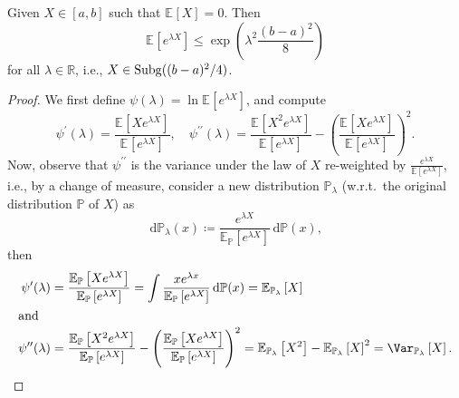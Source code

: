 \begin{lemma}\label{pf-lma:bounded-rv-is-sub-Gaussian}
	Given \(X\in [a, b]\) such that \(\mathbb{E}_{}\left[X \right] = 0\). Then
	\[
		\mathbb{E}_{}\left[e^{\lambda X} \right] \leq \exp (\lambda ^2 \frac{(b-a)^2}{8})
	\]
	for all \(\lambda \in \mathbb{R} \), i.e., \(X\in \operatorname{Subg}((b-a)^2 / 4) \).
\end{lemma}
\begin{proof}
	We first define \(\psi (\lambda ) = \ln \mathbb{E}_{}\left[e^{\lambda X} \right] \), and compute
	\[
		\psi ^{\prime} (\lambda ) = \frac{\mathbb{E}_{}\left[X e^{\lambda X} \right] }{\mathbb{E}_{}\left[e^{\lambda X} \right] },\quad
		\psi ^{\prime\prime} (\lambda ) = \frac{\mathbb{E}_{}\left[X^2 e^{\lambda X} \right] }{\mathbb{E}_{}\left[e^{\lambda X} \right] } - \left( \frac{\mathbb{E}_{}\left[X e^{\lambda X} \right] }{\mathbb{E}_{}\left[e^{\lambda X} \right] } \right) ^2.
	\]
	Now, observe that \(\psi ^{\prime\prime} \) is the variance under the law of \(X\) re-weighted by \(\frac{e^{\lambda X}}{\mathbb{E}_{}\left[e^{\lambda X} \right] }\), i.e., by a change of measure, consider a new distribution \(\mathbb{P} _\lambda \) (w.r.t.\ the original distribution \(\mathbb{P} \) of \(X\)) as
	\[
		\,\mathrm{d} \mathbb{P} _\lambda (x) \coloneqq \frac{e^{\lambda X}}{\mathbb{E}_{\mathbb{P} }\left[e^{\lambda X} \right] }\,\mathrm{d} \mathbb{P} (x),
	\]
	then
	\begin{align*}
		\psi ^{\prime} (\lambda )
		 & = \frac{\mathbb{E}_{\mathbb{P} }\left[X e^{\lambda X} \right] }{\mathbb{E}_{\mathbb{P} }\left[e^{\lambda X} \right] }
		= \int \frac{x e^{\lambda x}}{\mathbb{E}_{\mathbb{P} }\left[ e^{\lambda X}\right] } \,\mathrm{d} \mathbb{P} (x)
		= \mathbb{E}_{\mathbb{P} _\lambda }\left[ X \right]                                                                                                                                                                                                                   \\
		\shortintertext{and}
		\psi ^{\prime\prime} (\lambda )
		 & = \frac{\mathbb{E}_{\mathbb{P} }\left[ X^2 e^{\lambda X} \right] }{\mathbb{E}_{\mathbb{P} }\left[ e^{\lambda X} \right] } - \left( \frac{\mathbb{E}_{\mathbb{P} }\left[ X e^{\lambda X} \right] }{\mathbb{E}_{\mathbb{P} }\left[ e^{\lambda X}\right] } \right) ^2
		= \mathbb{E}_{\mathbb{P} _\lambda }\left[ X^2 \right] - \mathbb{E}_{\mathbb{P} _\lambda }\left[ X \right] ^2
		= \Var_{\mathbb{P} _\lambda }\left[X \right] .
	\end{align*}

\end{proof}
